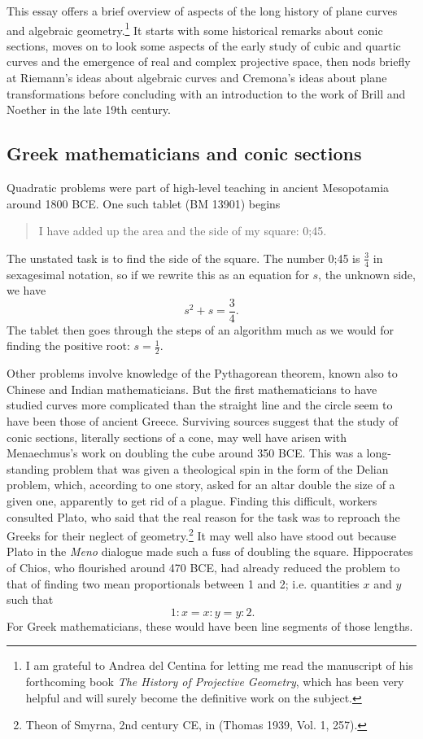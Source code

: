 %

This essay offers a brief overview of aspects of the long history of plane curves and algebraic geometry.\footnote{I am grateful to Andrea del Centina for letting me read the manuscript of his forthcoming book \emph{The History of Projective Geometry}, which has been very helpful and will surely become the definitive work on the subject.}   It starts with some historical remarks about conic sections, moves on to look some aspects of the early study of cubic and quartic curves and the emergence of real and complex projective space, then nods briefly at Riemann's ideas about algebraic curves and Cremona's ideas about plane transformations before concluding with an introduction to the work of Brill and Noether in the late 19th century. 

\subsection{Greek mathematicians and conic sections}
Quadratic problems were part of high-level teaching in ancient Mesopotamia around 1800 BCE. One such tablet (BM 13901) begins 
\begin{quote}
I have added up the area and the side of my square: 0;45.
\end{quote}
The unstated task is to find the side of the square.
The number 0;45 is $\frac{3}{4}$ in sexagesimal notation, so if we rewrite this as an equation for $s$, the unknown side, we have
\[s^2 + s = \frac{3}{4}.\]
The tablet then goes through the steps of an algorithm much as we would for finding the positive root: $s = \frac{1}{2}.$ 

Other problems involve knowledge of the Pythagorean theorem, known also to Chinese and Indian mathematicians. But the first mathematicians to have studied curves more complicated than the straight line and the circle seem to have been those of ancient Greece.  Surviving sources suggest that the study of conic sections, literally sections of a cone, may well have arisen with Menaechmus's work on doubling the cube around 350 BCE. This was a long-standing problem that was given a theological spin in the form of the Delian problem, which, according to one story, asked for an altar double the size of a given one, apparently to get rid of a plague. Finding this difficult, workers consulted Plato, who said that the real reason for the task was to reproach the Greeks for their neglect of geometry.\footnote{Theon of Smyrna, 2nd century CE, in (Thomas 1939, Vol. 1, 257).}
It may well also have stood out because Plato in the \emph{Meno} dialogue made such a fuss of doubling the square. Hippocrates of Chios, who flourished around 470 BCE,  had already reduced the problem to that of finding two mean proportionals between 1 and 2; i.e. quantities $x$ and $y$ such that 
\begin{equation}~\label{Menmus}
1:x= x:y = y: 2.
\end{equation}
For Greek mathematicians, these would have been line segments of those lengths. 

